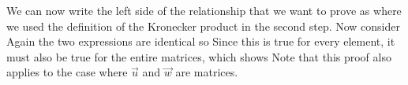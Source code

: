 We can now write the left side of the relationship that we want to prove as 
where we used the definition of the Kronecker product in the second step. 
Now consider 
Again the two expressions are identical so
Since this is true for every element, it must also be true for the entire matrices, which shows
Note that this proof also applies to the case where $\vec{u}$ and $\vec{w}$ are matrices. 